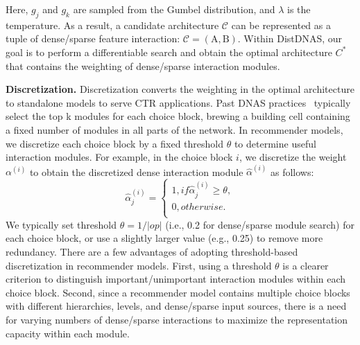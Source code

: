 Here, $g_{j}$ and $g_{k}$ are sampled from the Gumbel distribution, and $\lambda$ is the temperature. As a result, a candidate architecture $\mathcal{C}$ can be represented as a tuple of dense/sparse feature interaction: $\mathcal{C}=(\mathrm{A}, \mathrm{B})$. Within DistDNAS, our goal is to perform a differentiable search and obtain the optimal architecture $C^{*}$ that contains the weighting of dense/sparse interaction modules. 

\noindent \textbf{Discretization.} Discretization converts the weighting in the optimal architecture to standalone models to serve CTR applications. 
Past DNAS practices~\cite{liu2018darts} typically select the top k modules for each choice block, brewing a building cell containing a fixed number of modules in all parts of the network.
In recommender models, we discretize each choice block by a fixed threshold $\theta$ to determine useful interaction modules. For example, in the choice block $i$, we discretize the weight $\alpha^{(i)}$ to obtain the discretized dense interaction module $\hat{\alpha}^{(i)}$ as follows:
$$
\hat{\alpha}^{(i)}_{j} =
\begin{cases}
1, if    \hat{\alpha}^{(i)}_{j} \geq \theta, \\
0, otherwise.\\
\end{cases}
$$
We typically set threshold $\theta=1/|op|$ (i.e., 0.2 for dense/sparse module search) for each choice block, or use a slightly larger value (e.g., 0.25) to remove more redundancy.
There are a few advantages of adopting threshold-based discretization in recommender models. 
First, using a threshold $\theta$ is a clearer criterion to distinguish important/unimportant interaction modules within each choice block.
Second, since a recommender model contains multiple choice blocks with different hierarchies, levels, and dense/sparse input sources, there is a need for varying numbers of dense/sparse interactions to maximize the representation capacity within each module.

